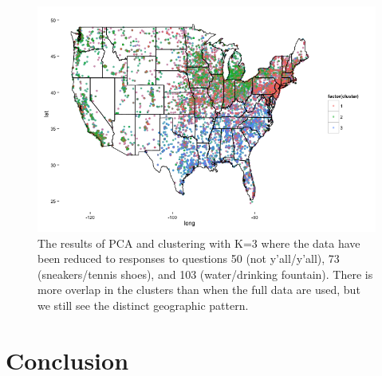 \documentclass[english]{article}\usepackage{graphicx, color}
\numberwithin{equation}{section}
\numberwithin{figure}{section}
\begin{document}
\begin{figure}
\begin{center}
\includegraphics[scale=.5]{pca3questions.png}
\end{center}
\caption{The results of PCA and clustering with K=3 where the data have been reduced to responses to questions 50 (not y'all/y'all), 73 (sneakers/tennis shoes), and 103 (water/drinking fountain). There is more overlap in the clusters than when the full data are used, but we still see the distinct geographic pattern.}
\end{figure}


\section{Conclusion}
\end{document}
